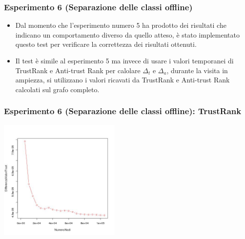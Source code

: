 \documentclass{beamer}
\begin{document}
\begin{frame}
\frametitle{Esperimento 6 {\tiny(Separazione delle classi offline)}}
\begin{itemize}
 \item Dal momento che l'esperimento numero 5 ha prodotto dei risultati che indicano un comportamento diverso da quello atteso, è stato implementato questo test per verificare la correttezza dei risultati ottenuti.
 \item Il test è simile al esperimento 5 ma invece di usare i valori temporanei di TrustRank e Anti-trust Rank per calolare \(\Delta_t\) e \(\Delta_a\), durante la visita in ampiezza, si utilizzano i valori ricavati da TrustRank e Anti-trust Rank calcolati sul grafo completo.
 \end{itemize}
\end{frame}
\begin{frame}
\frametitle{Esperimento 6 {\tiny(Separazione delle classi offline)}: TrustRank}
\begin{center}
 \includegraphics[height=6cm]{immagini/test6/averageCompleteTest_trust_62}
\end{center}
\end{frame}
\end{document}
